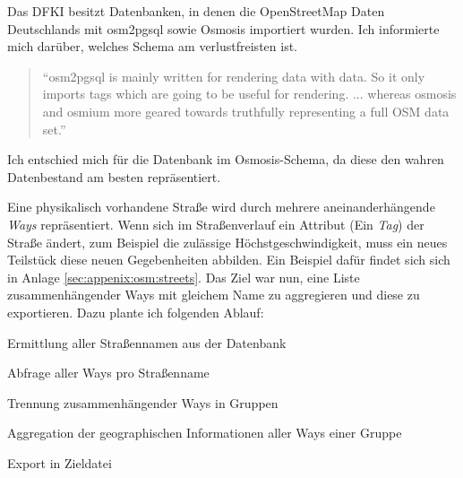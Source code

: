 Das DFKI besitzt Datenbanken, in denen die OpenStreetMap Daten Deutschlands mit osm2pgsql sowie Osmosis importiert wurden.
Ich informierte mich darüber, welches Schema am verlustfreisten ist.
\begin{quote}
``osm2pgsql is mainly written for rendering data with data. So it only imports tags which are going to be useful for rendering. ... whereas osmosis and osmium more geared towards truthfully representing a full OSM data set.'' \cite{WEB:Giswiki:Osm2pgsql:2015}
\end{quote}

Ich entschied mich für die Datenbank im Osmosis-Schema, da diese den wahren Datenbestand am besten repräsentiert.

Eine physikalisch vorhandene Straße wird durch mehrere aneinanderhängende \textit{Ways} repräsentiert.
Wenn sich im Straßenverlauf ein Attribut (Ein \textit{Tag}) der Straße ändert, zum Beispiel die zulässige Höchstgeschwindigkeit, muss ein neues Teilstück diese neuen Gegebenheiten abbilden.
Ein Beispiel dafür findet sich sich in Anlage \ref{sec:appenix:osm:streets}.
Das Ziel war nun, eine Liste zusammenhängender Ways mit gleichem Name zu aggregieren und diese zu exportieren. Dazu plante ich folgenden Ablauf:

\begin{compactenum}
  \item Ermittlung aller Straßennamen aus der Datenbank
  \item Abfrage aller Ways pro Straßenname
  \item Trennung zusammenhängender Ways in Gruppen
  \item Aggregation der geographischen Informationen aller Ways einer Gruppe
  \item Export in Zieldatei
\end{compactenum}


